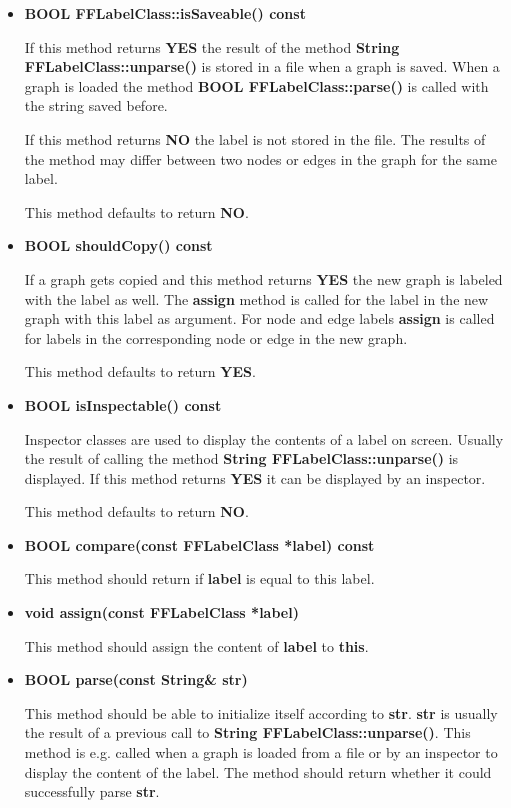 \begin{itemize}

\item{\bf BOOL FFLabelClass::isSaveable() const}
  
  If this method returns {\bf YES} the result of the method {\bf
    String FFLabelClass::unparse()} is stored in a file when a
  graph is saved. When a graph is loaded the method {\bf BOOL
    FFLabelClass::parse()} is called with the string saved
  before.
  
  If this method returns {\bf NO} the label is not stored in the
  file.  The results of the method may differ between two nodes
  or edges in the graph for the same label.

This method defaults to return {\bf NO}.

\item{\bf BOOL shouldCopy() const}
  
  If a graph gets copied and this method returns {\bf YES} the
  new graph is labeled with the label as well. The {\bf assign}
  method is called for the label in the new graph with this label
  as argument. For node and edge labels {\bf assign} is called
  for labels in the corresponding node or edge in the new graph.

This method defaults to return {\bf YES}.

\item{\bf BOOL isInspectable() const}
  
  Inspector classes are used to display the contents of
  a label on screen. Usually the result of calling the method
  {\bf String FFLabelClass::unparse()} is displayed. If this
  method returns {\bf YES} it can be displayed by an inspector.

This method defaults to return {\bf NO}.

\item{\bf BOOL compare(const FFLabelClass *label) const}

This method should return if {\bf label} is equal to this label. 

\item{\bf void assign(const FFLabelClass *label)}

  This method should assign the content of {\bf label} to {\bf this}.

\item{\bf BOOL parse(const String\& str)}
  
  This method should be able to initialize itself according to
  {\bf str}. {\bf str} is usually the result of a previous call
  to {\bf String FFLabelClass::unparse()}. This method is e.g.
  called when a graph is loaded from a file or by an inspector
  to display the content of the label.  The method should return
  whether it could successfully parse {\bf str}.


\end{itemize}
